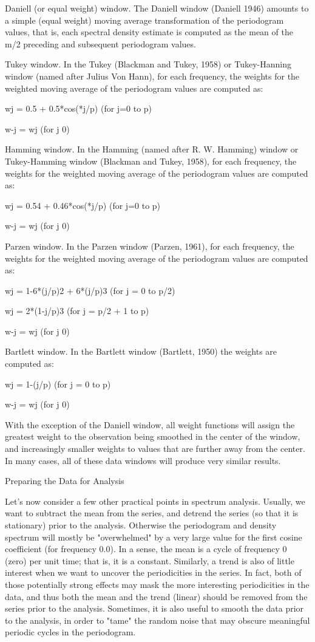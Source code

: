 Daniell (or equal weight) window. The Daniell window (Daniell 1946) amounts to a simple (equal weight) moving average transformation of the periodogram values, that is, each spectral density estimate is computed as the mean of the m/2 preceding and subsequent periodogram values.

Tukey window. In the Tukey (Blackman and Tukey, 1958) or Tukey-Hanning window (named after Julius Von Hann), for each frequency, the weights for the weighted moving average of the periodogram values are computed as:

wj = 0.5 + 0.5*cos(*j/p)    (for j=0 to p)

w-j = wj    (for j  0)

Hamming window. In the Hamming (named after R. W. Hamming) window or Tukey-Hamming window (Blackman and Tukey, 1958), for each frequency, the weights for the weighted moving average of the periodogram values are computed as:

wj = 0.54 + 0.46*cos(*j/p)    (for j=0 to p)

w-j = wj    (for j  0)

Parzen window. In the Parzen window (Parzen, 1961), for each frequency, the weights for the weighted moving average of the periodogram values are computed as:

wj = 1-6*(j/p)2 + 6*(j/p)3    (for j = 0 to p/2)

wj = 2*(1-j/p)3    (for j = p/2 + 1 to p)

w-j = wj    (for j  0)

Bartlett window. In the Bartlett window (Bartlett, 1950) the weights are computed as:

wj = 1-(j/p)    (for j = 0 to p)

w-j = wj    (for j  0)

With the exception of the Daniell window, all weight functions will assign the greatest weight to the observation being smoothed in the center of the window, and increasingly smaller weights to values that are further away from the center. In many cases, all of these data windows will produce very similar results.

Preparing the Data for Analysis

Let's now consider a few other practical points in spectrum analysis. Usually, we want to subtract the mean from the series, and detrend the series (so that it is stationary) prior to the analysis. Otherwise the periodogram and density spectrum will mostly be "overwhelmed" by a very large value for the first cosine coefficient (for frequency 0.0). In a sense, the mean is a cycle of frequency 0 (zero) per unit time; that is, it is a constant. Similarly, a trend is also of little interest when we want to uncover the periodicities in the series. In fact, both of those potentially strong effects may mask the more interesting periodicities in the data, and thus both the mean and the trend (linear) should be removed from the series prior to the analysis. Sometimes, it is also useful to smooth the data prior to the analysis, in order to "tame" the random noise that may obscure meaningful periodic cycles in the periodogram.

